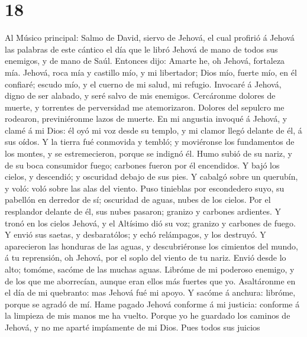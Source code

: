 \hypertarget{section-17}{%
\section{18}\label{section-17}}

 Al Músico principal: Salmo de David, siervo de Jehová, el
cual profirió á Jehová las palabras de este cántico el día que le libró
Jehová de mano de todos sus enemigos, y de mano de Saúl. Entonces dijo:
Amarte he, oh Jehová, fortaleza mía.  Jehová, roca mía y
castillo mío, y mi libertador; Dios mío, fuerte mío, en él confiaré;
escudo mío, y el cuerno de mi salud, mi refugio.  Invocaré
á Jehová, digno de ser alabado, y seré salvo de mis enemigos.
 Cercáronme dolores de muerte, y torrentes de perversidad
me atemorizaron.  Dolores del sepulcro me rodearon,
previniéronme lazos de muerte.  En mi angustia invoqué á
Jehová, y clamé á mi Dios: él oyó mi voz desde su templo, y mi clamor
llegó delante de él, á sus oídos.  Y la tierra fué
conmovida y tembló; y moviéronse los fundamentos de los montes, y se
estremecieron, porque se indignó él.  Humo subió de su
nariz, y de su boca consumidor fuego; carbones fueron por él encendidos.
 Y bajó los cielos, y descendió; y oscuridad debajo de sus
pies.  Y cabalgó sobre un querubín, y voló: voló sobre
las alas del viento.  Puso tinieblas por escondedero
suyo, su pabellón en derredor de sí; oscuridad de aguas, nubes de los
cielos.  Por el resplandor delante de él, sus nubes
pasaron; granizo y carbones ardientes.  Y tronó en los
cielos Jehová, y el Altísimo dió su voz; granizo y carbones de fuego.
 Y envió sus saetas, y desbaratólos; y echó relámpagos, y
los destruyó.  Y aparecieron las honduras de las aguas, y
descubriéronse los cimientos del mundo, á tu reprensión, oh Jehová, por
el soplo del viento de tu nariz.  Envió desde lo alto;
tomóme, sacóme de las muchas aguas.  Libróme de mi
poderoso enemigo, y de los que me aborrecían, aunque eran ellos más
fuertes que yo.  Asaltáronme en el día de mi quebranto:
mas Jehová fué mi apoyo.  Y sacóme á anchura: libróme,
porque se agradó de mí.  Hame pagado Jehová conforme á mi
justicia: conforme á la limpieza de mis manos me ha vuelto.
 Porque yo he guardado los caminos de Jehová, y no me
aparté impíamente de mi Dios.  Pues todos sus juicios
